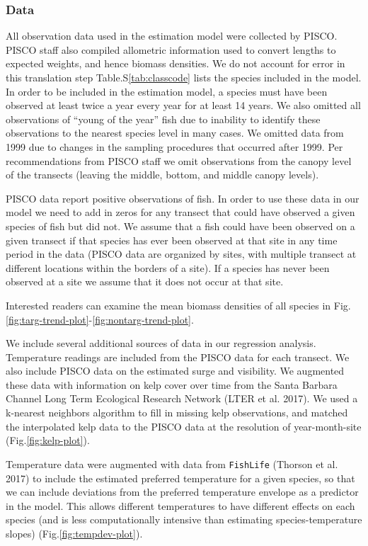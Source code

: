 \documentclass[]{article}
\begin{document}
\hypertarget{data}{%
\subsubsection{Data}\label{data}}

All observation data used in the estimation model were collected by PISCO. PISCO staff also compiled allometric information used to convert lengths to expected weights, and hence biomass densities. We do not account for error in this translation step Table.S\ref{tab:classcode} lists the species included in the model. In order to be included in the estimation model, a species must have been observed at least twice a year every year for at least 14 years. We also omitted all observations of ``young of the year'' fish due to inability to identify these observations to the nearest species level in many cases. We omitted data from 1999 due to changes in the sampling procedures that occurred after 1999. Per recommendations from PISCO staff we omit observations from the canopy level of the transects (leaving the middle, bottom, and middle canopy levels).

PISCO data report positive observations of fish. In order to use these data in our model we need to add in zeros for any transect that could have observed a given species of fish but did not. We assume that a fish could have been observed on a given transect if that species has ever been observed at that site in any time period in the data (PISCO data are organized by sites, with multiple transect at different locations within the borders of a site). If a species has never been observed at a site we assume that it does not occur at that site.

Interested readers can examine the mean biomass densities of all species in Fig.\ref{fig:targ-trend-plot}-\ref{fig:nontarg-trend-plot}.

We include several additional sources of data in our regression analysis. Temperature readings are included from the PISCO data for each transect. We also include PISCO data on the estimated surge and visibility. We augmented these data with information on kelp cover over time from the Santa Barbara Channel Long Term Ecological Research Network (LTER et al. 2017). We used a k-nearest neighbors algorithm to fill in missing kelp observations, and matched the interpolated kelp data to the PISCO data at the resolution of year-month-site (Fig.\ref{fig:kelp-plot}).

Temperature data were augmented with data from \texttt{FishLife} (Thorson et al. 2017) to include the estimated preferred temperature for a given species, so that we can include deviations from the preferred temperature envelope as a predictor in the model. This allows different temperatures to have different effects on each species (and is less computationally intensive than estimating species-temperature slopes) (Fig.\ref{fig:tempdev-plot}).
\end{document}
